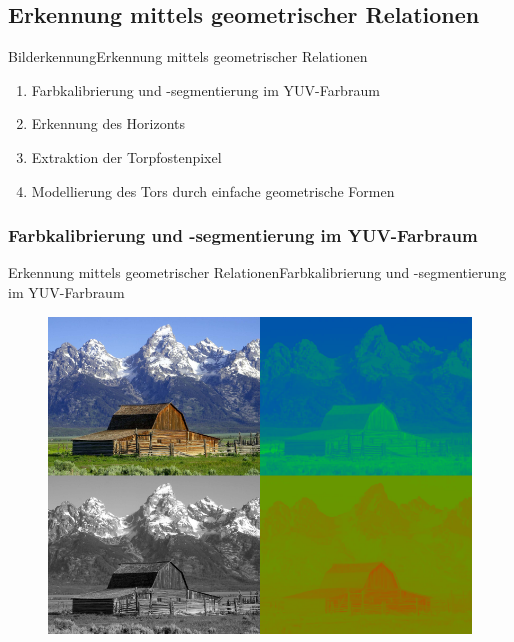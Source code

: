\documentclass{beamer}
\begin{document}
\subsection{Erkennung mittels geometrischer Relationen}
\begin{frame}{Bilderkennung}{Erkennung mittels geometrischer Relationen}
\begin{enumerate}
    \item Farbkalibrierung und -segmentierung im YUV-Farbraum
    \item Erkennung des Horizonts
    \item Extraktion der Torpfostenpixel
    \item Modellierung des Tors durch einfache geometrische Formen
\end{enumerate}
\end{frame}

\subsubsection{Farbkalibrierung und -segmentierung im YUV-Farbraum}
\begin{frame}{Erkennung mittels geometrischer Relationen}{Farbkalibrierung und -segmentierung im YUV-Farbraum}
\begin{figure}[htp]
\centering
\includegraphics[scale=0.3]{Barn-yuv.png}
\end{figure}
\end{frame}
\end{document}
